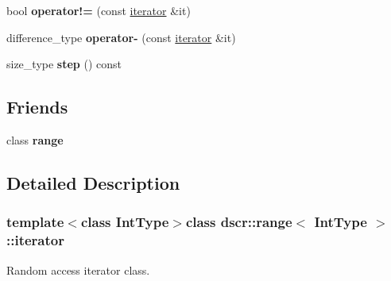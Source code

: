 \begin{DoxyCompactItemize}
\item 
\hypertarget{classdscr_1_1range_1_1iterator_a7f079722eb4030388de622774657ff5e}{bool {\bfseries operator!=} (const \hyperlink{classdscr_1_1range_1_1iterator}{iterator} \&it)}\label{classdscr_1_1range_1_1iterator_a7f079722eb4030388de622774657ff5e}

\item 
\hypertarget{classdscr_1_1range_1_1iterator_a6282c8597291ec16f501ea910fe9a116}{difference\-\_\-type {\bfseries operator-\/} (const \hyperlink{classdscr_1_1range_1_1iterator}{iterator} \&it)}\label{classdscr_1_1range_1_1iterator_a6282c8597291ec16f501ea910fe9a116}

\item 
\hypertarget{classdscr_1_1range_1_1iterator_acb164839b228c61dc47261bc99c71395}{size\-\_\-type {\bfseries step} () const }\label{classdscr_1_1range_1_1iterator_acb164839b228c61dc47261bc99c71395}

\end{DoxyCompactItemize}
\subsection*{Friends}
\begin{DoxyCompactItemize}
\item 
\hypertarget{classdscr_1_1range_1_1iterator_a982e754214d3a01b73c8a27323b791c0}{class {\bfseries range}}\label{classdscr_1_1range_1_1iterator_a982e754214d3a01b73c8a27323b791c0}

\end{DoxyCompactItemize}


\subsection{Detailed Description}
\subsubsection*{template$<$class Int\-Type$>$class dscr\-::range$<$ Int\-Type $>$\-::iterator}

Random access iterator class. 

